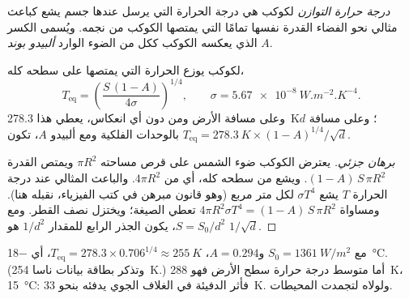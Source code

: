 \begin{definition}\label{def:g10:habitable-planet:equilibrium-temperature}
\emph{درجة حرارة التوازن} لكوكب هي درجة الحرارة
التي يرسل عندها جسم يشع كباعث مثالي نحو الفضاء القدرة نفسها تمامًا التي
يمتصها الكوكب من نجمه. ويُسمى الكسر الذي يعكسه الكوكب ككل من الضوء الوارد
\emph{ألبيدو بوند} $A$.
\end{definition}

\begin{proposition}\label{prop:g10:habitable-planet:teq}
لكوكب يوزع الحرارة التي يمتصها على سطحه كله،
\[
  T_{\mathrm{eq}} = \left(\frac{S\,(1-A)}{4\sigma}\right)^{1/4},
  \qquad \sigma = \qty{5.67e-8}{W.m^{-2}.K^{-4}}.
\]
وعلى مسافة الأرض ومن دون أي انعكاس، يعطي هذا
\qty{278.3}{K}؛ وعلى مسافة $d$ بالوحدات الفلكية ومع ألبيدو $A$، تكون
$T_{\mathrm{eq}} = \qty{278.3}{K} \times (1-A)^{1/4}/\sqrt{d}$.
\end{proposition}

\begin{proof}[برهان جزئي]
يعترض الكوكب ضوء الشمس على قرص مساحته $\pi R^2$ ويمتص القدرة
$(1-A)\,S\,\pi R^2$. ويشع من سطحه كله، أي من $4\pi R^2$.
والباعث المثالي عند درجة الحرارة $T$ يشع $\sigma T^4$ لكل متر مربع (وهو قانون
مبرهن في كتب الفيزياء، نقبله هنا). ومساواة
$4\pi R^2 \sigma T^4 = (1-A)\,S\,\pi R^2$ تعطي الصيغة؛ ويختزل نصف القطر.
ومع $S = S_0/d^2$، يكون الجذر الرابع للمقدار $1/d^2$ هو $1/\sqrt d$.
\end{proof}

\begin{example}[الأرض]\label{ex:g10:habitable-planet:earth}
مع $S_0 = \qty{1361}{W/m^2}$ و$A = 0.294$،
$T_{\mathrm{eq}} = 278.3 \times 0.706^{1/4} \approx \qty{255}{K}$، أي
\qty{-18}{\degreeCelsius}. (وتذكر بطاقة بيانات ناسا \qty{254}{K}.) أما متوسط
درجة حرارة سطح الأرض فهو \qty{288}{K}،
\qty{15}{\degreeCelsius}: فأثر الدفيئة في الغلاف الجوي يدفئه بنحو
\qty{33}{K}. ولولاه لتجمدت المحيطات.
\end{example}

